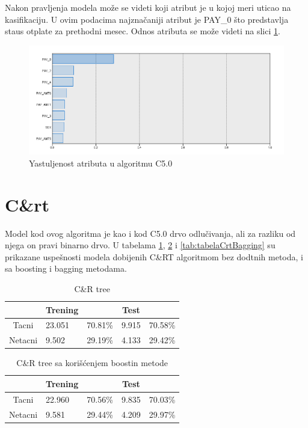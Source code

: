 \documentclass[a4paper]{article}
\begin{document}
Nakon pravljenja modela može se videti koji atribut je u kojoj meri uticao na kasifikaciju. U ovim podacima najznačaniji atribut je PAY\_0 što predstavlja staus otplate za prethodni mesec. Odnos atributa se može videti na slici \ref{fig:najzastupljeniji}.


\begin{figure}[h!]
\begin{center}
    \includegraphics[scale=0.50]{Najzastuljeniji.png}
    \caption{Yastuljenost atributa u algoritmu C5.0}
    \label{fig:najzastupljeniji}
\end{center}
\end{figure}

\clearpage
\section{C\&rt}	
\label{sec:crt}


Model kod ovog algoritma je kao i kod C5.0 drvo odlučivanja, ali za razliku od njega on pravi binarno drvo. U tabelama \ref{tab:tabelaCrt}, \ref{tab:tabelaCrtBoosting} i \ref{tab:tabelaCrtBagging} su prikazane uspešnosti modela dobijenih C\&RT algoritmom bez dodtnih metoda, i sa boosting i bagging metodama.

\begin{table}[h!]
\begin{center}
\caption{C\&R tree}
\begin{tabular}{|c|l|r|c|c|} \hline
& Trening& & Test & \\ \hline
Tacni &23.051 &70.81\% &9.915 &70.58\%\\ \hline
Netacni &9.502 &29.19\% &4.133 &29.42\%\\ \hline
\end{tabular}
\label{tab:tabelaCrt}
\end{center}
\end{table}


\begin{table}[h!]
\begin{center}
\caption{C\&R tree sa korišćenjem boostin metode}
\begin{tabular}{|c|l|r|c|c|} \hline
& Trening& & Test & \\ \hline
Tacni &22.960 &70.56\% &9.835 &70.03\%\\ \hline
Netacni &9.581 &29.44\% &4.209 &29.97\%\\ \hline
\end{tabular}
\label{tab:tabelaCrtBoosting}
\end{center}
\end{table}
\end{document}
